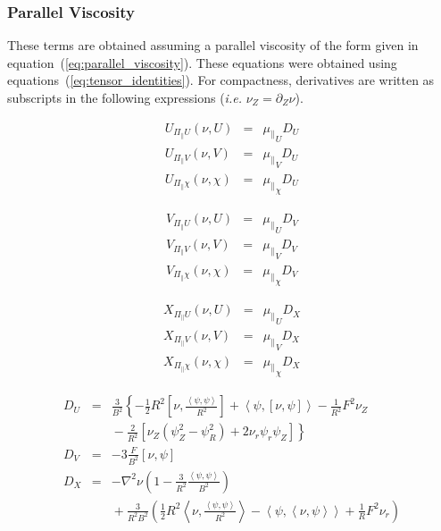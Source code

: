 \documentclass[letterpaper]{book}
\newcommand{\tensor}[1]{\mathsf{#1}}
\renewcommand{\P}{\tensor{\Pi}}
\newcommand{\lp}[1]{\nabla^2 #1}
\newcommand{\pb}[2]{\left[#1,#2\right]}
\newcommand{\ip}[2]{\left\langle  #1,#2\right\rangle}
\begin{document}
\subsubsection{Parallel Viscosity}

These terms are obtained assuming a parallel viscosity of the form
given in equation~(\ref{eq:parallel_viscosity}).  These equations were
obtained using equations~(\ref{eq:tensor_identities}).  For
compactness, derivatives are written as subscripts in the following
expressions (\textit{i.e.} $\nu_Z = \partial_Z \nu$).

\begin{equation}
  \begin{array}{lcl}
    U_{\P_\parallel U}(\nu, U) & = & {\mu_\parallel}_U D_U
    \\
    U_{\P_\parallel V}(\nu, V) & = & {\mu_\parallel}_V D_U
    \\
    U_{\P_\parallel \chi}(\nu, \chi) & = & {\mu_\parallel}_\chi D_U
  \end{array}
\end{equation}

\begin{equation}
  \begin{array}{lcl}
    V_{\P_\parallel U}(\nu, U) & = & {\mu_\parallel}_U D_V
    \\
    V_{\P_\parallel V}(\nu, V) & = & {\mu_\parallel}_V D_V
    \\
    V_{\P_\parallel \chi}(\nu, \chi) & = & {\mu_\parallel}_\chi D_V
  \end{array}
\end{equation}

\begin{equation}
  \begin{array}{lcl}
    X_{\P_\parallel U}(\nu, U) & = & {\mu_\parallel}_U D_X
    \\
    X_{\P_\parallel V}(\nu, V) & = & {\mu_\parallel}_V D_X
    \\
    X_{\P_\parallel \chi}(\nu, \chi) & = & {\mu_\parallel}_\chi D_X
  \end{array}
\end{equation}

\begin{eqnarray*}
  D_U & = & \frac{3}{B^2} \left\{ 
  - \frac{1}{2}R^2\pb{\nu}{\frac{\ip{\psi}{\psi}}{R^2}}
  + \ip{\psi}{\pb{\nu}{\psi}} 
  - \frac{1}{R^2} F^2 \nu_Z 
  \right.\\ && \left. \mbox{}
  - \frac{2}{R^2}\left[ \nu_Z (\psi_Z^2 - \psi_R^2) + 2\nu_r \psi_r \psi_Z
    \right]
  \right\}
  \\
  D_V & = & - 3 \frac{F}{B^2} \pb{\nu}{\psi}
  \\
  D_X & = & - \lp{\nu} 
  \left(1 - \frac{3}{R^2}\frac{\ip{\psi}{\psi}}{B^2} \right)
  \\ &&  \mbox{}
  + \frac{3}{R^2 B^2} \left(
    \frac{1}{2}R^2\ip{\nu}{\frac{\ip{\psi}{\psi}}{R^2}}
    - \ip{\psi}{\ip{\nu}{\psi}} 
    + \frac{1}{R} F^2 \nu_r \right)
\end{eqnarray*}
\end{document}
